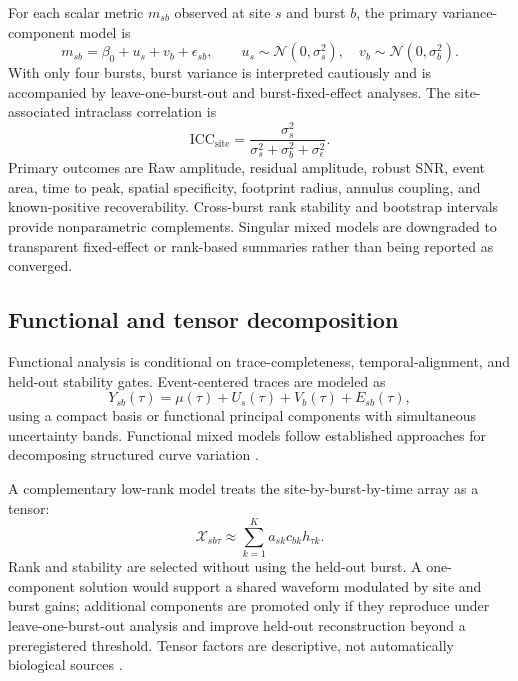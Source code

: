 For each scalar metric $m_{sb}$ observed at site $s$ and burst $b$, the primary variance-component model is
\begin{equation}
  m_{sb}=\beta_0+u_s+v_b+\epsilon_{sb},
  \qquad
  u_s\sim\mathcal N(0,\sigma_s^2),\quad
  v_b\sim\mathcal N(0,\sigma_b^2).
\end{equation}
With only four bursts, burst variance is interpreted cautiously and is accompanied by leave-one-burst-out and burst-fixed-effect analyses. The site-associated intraclass correlation is
\begin{equation}
  \mathrm{ICC}_{\mathrm{site}}=
  \frac{\sigma_s^2}{\sigma_s^2+\sigma_b^2+\sigma_\epsilon^2}.
\end{equation}
Primary outcomes are Raw amplitude, residual amplitude, robust SNR, event area, time to peak, spatial specificity, footprint radius, annulus coupling, and known-positive recoverability. Cross-burst rank stability and bootstrap intervals provide nonparametric complements. Singular mixed models are downgraded to transparent fixed-effect or rank-based summaries rather than being reported as converged.

\subsection{Functional and tensor decomposition}
\label{sec:functional-models}

Functional analysis is conditional on trace-completeness, temporal-alignment, and held-out stability gates. Event-centered traces are modeled as
\begin{equation}
  Y_{sb}(\tau)=\mu(\tau)+U_s(\tau)+V_b(\tau)+E_{sb}(\tau),
\end{equation}
using a compact basis or functional principal components with simultaneous uncertainty bands. Functional mixed models follow established approaches for decomposing structured curve variation \citep{morris2006functional}.

A complementary low-rank model treats the site-by-burst-by-time array as a tensor:
\begin{equation}
  \mathcal X_{sb\tau}\approx
  \sum_{k=1}^{K}a_{sk}c_{bk}h_{\tau k}.
\end{equation}
Rank and stability are selected without using the held-out burst. A one-component solution would support a shared waveform modulated by site and burst gains; additional components are promoted only if they reproduce under leave-one-burst-out analysis and improve held-out reconstruction beyond a preregistered threshold. Tensor factors are descriptive, not automatically biological sources \citep{kolda2009tensor}.

